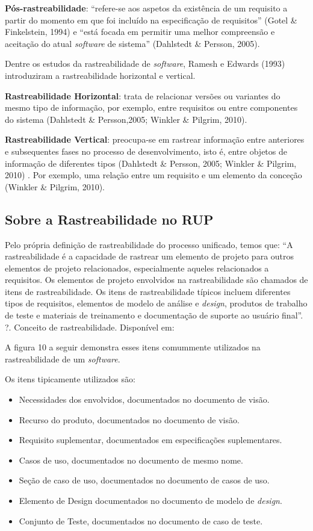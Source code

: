 \textbf{Pós-rastreabilidade}: “refere-se aos aspetos da existência de um requisito a partir do momento em que foi incluído na especificação de requisitos” (Gotel \& Finkelstein, 1994) e “está focada em permitir uma melhor compreensão e aceitação do atual \textit{software} de sistema” (Dahlstedt \& Persson, 2005).

Dentre os estudos da rastreabilidade de \textit{software}, Ramesh e Edwards (1993) introduziram a rastreabilidade horizontal e vertical.

\textbf{Rastreabilidade Horizontal}: trata de relacionar versões ou variantes do mesmo tipo de informação, por exemplo, entre requisitos ou entre componentes do sistema (Dahlstedt \& Persson,2005; Winkler \& Pilgrim, 2010).

\textbf{Rastreabilidade Vertical}: preocupa-se em rastrear informação entre anteriores e subsequentes fases no processo de desenvolvimento, isto é, entre objetos de informação de diferentes tipos (Dahlstedt \& Persson, 2005; Winkler \& Pilgrim, 2010) . Por exemplo, uma relação entre um requisito e um elemento da conceção (Winkler \& Pilgrim, 2010).

\subsection{Sobre a Rastreabilidade no RUP}

Pelo própria definição de rastreabilidade do processo unificado, temos que: “A rastreabilidade é a capacidade de rastrear um elemento de projeto para outros elementos de projeto relacionados, especialmente aqueles relacionados a requisitos. Os elementos de projeto envolvidos na rastreabilidade são chamados de itens de rastreabilidade.  Os itens de rastreabilidade típicos incluem diferentes tipos de requisitos, elementos de modelo de análise e \textit{design}, produtos de trabalho de teste e materiais de treinamento e documentação de suporte ao usuário final”. ?. Conceito de rastreabilidade. Disponível em:%

A figura 10 a seguir demonstra esses itens comummente utilizados na rastreabilidade de um \textit{software}.

Os itens tipicamente utilizados são:

\begin{itemize}
\item Necessidades dos envolvidos, documentados no documento de visão.
\item Recurso do produto, documentados no documento de visão.
\item Requisito suplementar, documentados em especificações suplementares.
\item Casos de uso, documentados no documento de mesmo nome.
\item Seção de caso de uso, documentados no documento de casos de uso.
\item Elemento de Design documentados no documento de modelo de \textit{design}.
\item Conjunto de Teste, documentados no documento de caso de teste.
\end{itemize}

